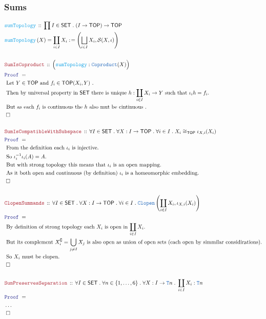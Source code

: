 \documentclass[12pt]{scrartcl}
\newcommand{\TYPE}[1]{\textcolor{NavyBlue}{\mathtt{#1}}}
\newcommand{\FUNC}[1]{\textcolor{Cerulean}{\mathtt{#1}}}
\newcommand{\LOGIC}[1]{\textcolor{Blue}{\mathtt{#1}}}
\newcommand{\THM}[1]{\textcolor{Maroon}{\mathtt{#1}}}
\renewcommand{\.}{\; . \;}
\newcommand{\de}{: \kern 0.1pc =}
\newcommand{\Act}[1]{\left( #1 \right)}
\newcommand{\Theorem}[2]{& \THM{#1} \, :: \, #2 \\ & \Proof = \\ }
\newcommand{\DeclareFunc}[2]{& \FUNC{#1} \, :: \, #2 \\}
\newcommand{\DefineNamedFunc}[4]{&  \FUNC{#1}\Act{#2} = #3 \de #4 \\}
\newcommand{\Page}[1]{ \begin{align*} #1 \end{align*}   }
\newcommand{\NoProof}{ & \ldots \\ \EndProof}
\newcommand{\Explain}[1]{& \text{#1.} \\}
\renewcommand{\c}{\complement}
\newcommand{\QED}{\; \square}
\newcommand{\EndProof}{& \QED \\}
\newcommand{\Proof}{\LOGIC{Proof} \; }
\newcommand{\SET}{\mathsf{SET}}
\newcommand{\TOP}{\mathsf{TOP}}
\renewcommand{\S}{\mathcal{S}}
\begin{document}
\subsubsection{Sums}
\Page{
	\DeclareFunc{sumTopology}
	{
		\prod I \in \SET \. 
		( I \to \TOP) \to \TOP 
	}
	\DefineNamedFunc{sumTopology}{X}{\coprod_{i \in I} X_i}
	{
		\left( \bigsqcup_{i \in I} X_i,
			\S(X,\iota)		
		\right)
	} 
	\\
	\Theorem{SumIsCoproduct}{\Big(\FUNC{sumTopology} : \TYPE{Coproduct}(X)\Big)}
	\Explain{ 
		Let $Y\in \TOP$ and $f_i \in \TOP(X_i,Y)$ }
	\Explain{
		Then by universal property in $\SET$ 
		there is unique $h : \coprod_{i \in I} X_i \to Y$
		such that $\iota_i h = f_i$}
	\Explain{
		But as each $f_i$ is continuous the $h$ also mut be cintinuous
	}
	\EndProof
	\\
	\Theorem{SumIsCompatibleWithSubspace}
	{
		\forall I \in \SET \.
		\forall X : I \to \TOP \.
		\forall i \in I \. 
		X_i \cong_{\TOP} \iota_{X,i}(X_i)
	}
	\Explain{ 
		From the definition each $\iota_i$ is injective}
	\Explain{
		So $\iota^{-1}_i \iota_i(A) = A$}
	\Explain{
		But with strong topology this means that $\iota_i$ is an open mapping}
	\Explain{
		As it both open and continuous (by definition) $\iota_i$ is a homeomorphic
		embedding}
	\EndProof
	\\
	\Theorem{ClopenSummands}
	{
		\forall I \in \SET \.
		\forall X : I \to \TOP \.
		\forall i \in I \.
		\TYPE{Clopen}\left( \coprod_{i \in I}  X_i, \iota_{X,i}(X_i) \right) 
	}
	\Explain{ By definition of strong topology each $X_i$ is open in $\coprod_{i \in I} X_i$}
	\Explain{
		But its complement $X_i^\c = \bigcup_{j \neq I} X_j$ is also open as union
		of open sets (each open by simmilar considirations)}
	\Explain{
		So $X_i$ must be clopen}
	\EndProof
	\\
	\Theorem{SumPreservesSeparation}
	{
		\forall I \in \SET \.
		\forall n \in \{1,\ldots,6\} \.
		\forall X : I \to \TYPE{T}n \. 
		\coprod_{i \in I} X_i  : \TYPE{T}n
	}
	\NoProof
}
\newpage
\end{document}

